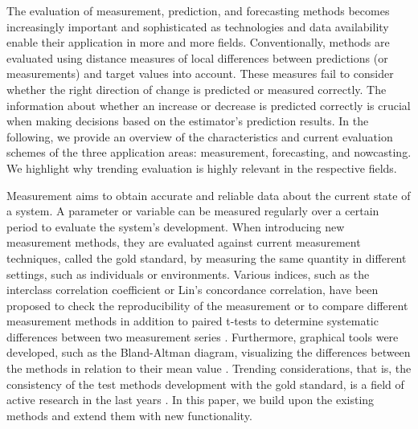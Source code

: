 The evaluation of measurement, prediction, and forecasting methods becomes increasingly important and sophisticated as technologies and data availability enable their application in more and more fields. 
Conventionally, methods are evaluated using distance measures of local differences between predictions (or measurements) and target values into account. 
These measures fail to consider whether the right direction of change is predicted or measured correctly.
The information about whether an increase or decrease is predicted correctly is crucial when making decisions based on the estimator's prediction results. 
In the following, we provide an overview of the characteristics and current evaluation schemes of the three application areas: measurement, forecasting, and nowcasting.
We highlight why trending evaluation is highly relevant in the respective fields.

Measurement aims to obtain accurate and reliable data about the current state of a system. 
A parameter or variable can be measured regularly over a certain period to evaluate the system's development.
When introducing new measurement methods, they are evaluated against current measurement techniques, called the gold standard, by measuring the same quantity in different settings, such as individuals or environments.
Various indices, such as the interclass correlation coefficient or Lin's concordance correlation, have been proposed to check the reproducibility of the measurement or to compare different measurement methods \parencite{lawrence1989concordance,koo2016guideline} in addition to paired t-tests to determine systematic differences between two measurement series \parencite{watson2010method}. 
Furthermore, graphical tools were developed, such as the Bland-Altman diagram, visualizing the differences between the methods in relation to their mean value \parencite{bland1986statistical}. 
Trending considerations, that is, the consistency of the test methods development with the gold standard, is a field of active research in the last years \parencite{Saugel2015,saugel2018error,hiraishi2021concordance}. 
In this paper, we build upon the existing methods and extend them with new functionality.

